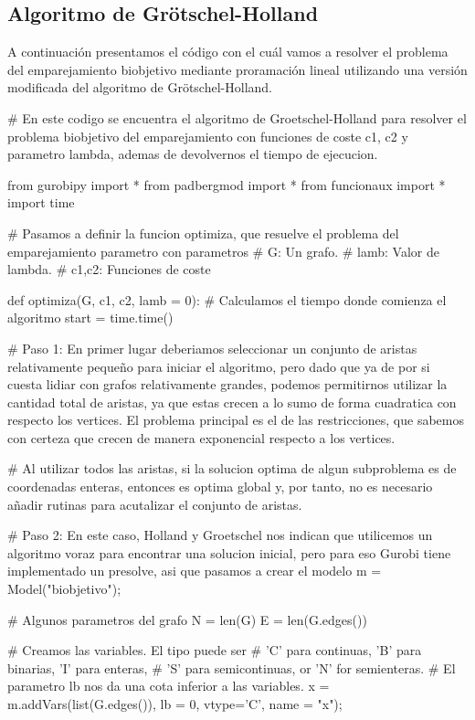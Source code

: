 \documentclass[twoside,a4paper,openright,12pt]{book}
\begin{document}
\subsection{Algoritmo de Grötschel-Holland}
A continuación presentamos el código con el cuál vamos a resolver el problema del emparejamiento biobjetivo mediante proramación lineal utilizando una versión modificada del algoritmo de Grötschel-Holland. 
\begin{pythone}
# En este codigo se encuentra el algoritmo de Groetschel-Holland para resolver el problema biobjetivo del emparejamiento con funciones de coste c1, c2 y parametro lambda, ademas de devolvernos el tiempo de ejecucion.


from gurobipy import *
from padbergmod import *
from funcionaux import *
import time

# Pasamos a definir la funcion optimiza, que resuelve el problema del emparejamiento parametro con parametros
# G: Un grafo.
# lamb: Valor de lambda.
# c1,c2: Funciones de coste

def optimiza(G, c1, c2, lamb = 0):
    # Calculamos el tiempo donde comienza el algoritmo
    start = time.time()
    
    # Paso 1: En primer lugar deberiamos seleccionar un conjunto de aristas relativamente pequeño para iniciar el algoritmo, pero dado que ya de por si cuesta lidiar con grafos relativamente grandes, podemos permitirnos utilizar la cantidad total de aristas, ya que estas crecen a lo sumo de forma cuadratica con respecto los vertices. El problema principal es el de las restricciones, que sabemos con certeza que crecen de manera exponencial respecto a los vertices. 
    
    # Al utilizar todos las aristas, si la solucion optima de algun subproblema es de coordenadas enteras, entonces es optima global y, por tanto, no es necesario añadir rutinas para acutalizar el conjunto de aristas.
    
    # Paso 2: En este caso, Holland y Groetschel nos indican que utilicemos un algoritmo voraz para encontrar una solucion inicial, pero para eso Gurobi tiene implementado un presolve, asi que pasamos a crear el modelo
    m = Model("biobjetivo");
    
    # Algunos parametros del grafo
    N = len(G)
    E = len(G.edges())
    
    # Creamos las variables. El tipo puede ser 
    # 'C' para continuas, 'B' para binarias, 'I' para enteras,
    # 'S' para semicontinuas, or 'N' for semienteras.
    # El parametro lb nos da una cota inferior a las variables.
    x = m.addVars(list(G.edges()), lb = 0, vtype='C', 
    	name = "x");
    

\end{pythone}
\end{document}
